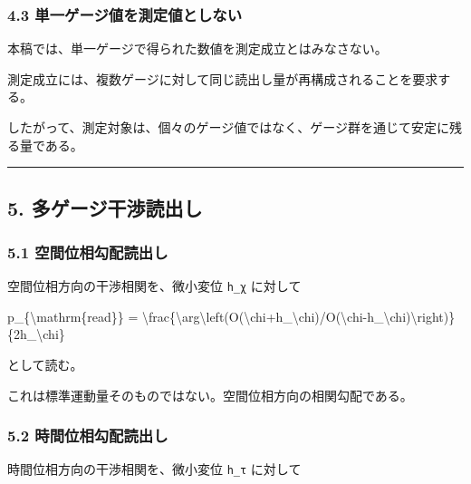 \documentclass[
  a4paper,
]{article}
\newenvironment{Shaded}{}{}
\newcommand{\NormalTok}[1]{#1}
\begin{document}
\subsubsection{4.3
単一ゲージ値を測定値としない}\label{ux5358ux4e00ux30b2ux30fcux30b8ux5024ux3092ux6e2cux5b9aux5024ux3068ux3057ux306aux3044}

本稿では、単一ゲージで得られた数値を測定成立とはみなさない。

測定成立には、複数ゲージに対して同じ読出し量が再構成されることを要求する。

したがって、測定対象は、個々のゲージ値ではなく、ゲージ群を通じて安定に残る量である。

\begin{center}\rule{0.5\linewidth}{0.5pt}\end{center}

\subsection{5.
多ゲージ干渉読出し}\label{ux591aux30b2ux30fcux30b8ux5e72ux6e09ux8aadux51faux3057}

\subsubsection{5.1
空間位相勾配読出し}\label{ux7a7aux9593ux4f4dux76f8ux52feux914dux8aadux51faux3057}

空間位相方向の干渉相関を、微小変位 \texttt{h\_χ} に対して

\begin{Shaded}
\begin{Highlighting}[]
\NormalTok{p\_\{\textbackslash{}mathrm\{read\}\}}
\NormalTok{=}
\NormalTok{\textbackslash{}frac\{\textbackslash{}arg\textbackslash{}left(O(\textbackslash{}chi+h\_\textbackslash{}chi)/O(\textbackslash{}chi{-}h\_\textbackslash{}chi)\textbackslash{}right)\}}
\NormalTok{\{2h\_\textbackslash{}chi\}}
\end{Highlighting}
\end{Shaded}

として読む。

これは標準運動量そのものではない。空間位相方向の相関勾配である。

\subsubsection{5.2
時間位相勾配読出し}\label{ux6642ux9593ux4f4dux76f8ux52feux914dux8aadux51faux3057}

時間位相方向の干渉相関を、微小変位 \texttt{h\_τ} に対して
\end{document}

